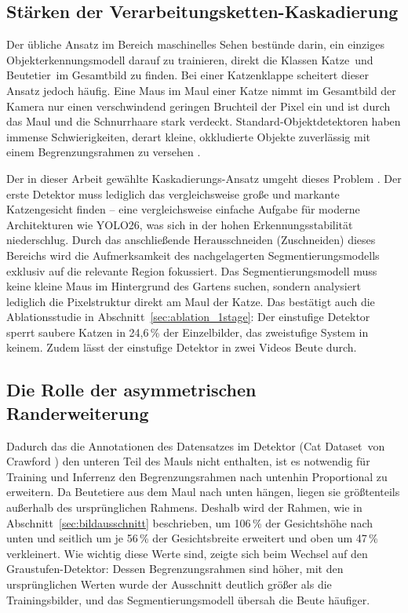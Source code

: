 \subsection{Stärken der Verarbeitungsketten-Kaskadierung}
Der übliche Ansatz im Bereich maschinelles Sehen bestünde darin, ein einziges Objekterkennungsmodell darauf zu trainieren, direkt die Klassen \glqq Katze\grqq\ und \glqq Beutetier\grqq\ im Gesamtbild zu finden. Bei einer Katzenklappe scheitert dieser Ansatz jedoch häufig. Eine Maus im Maul einer Katze nimmt im Gesamtbild der Kamera nur einen verschwindend geringen Bruchteil der Pixel ein und ist durch das Maul und die Schnurrhaare stark verdeckt. Standard-Objektdetektoren haben immense Schwierigkeiten, derart kleine, okkludierte Objekte zuverlässig mit einem Begrenzungsrahmen zu versehen \cite{tong2020small}.

Der in dieser Arbeit gewählte Kaskadierungs-Ansatz umgeht dieses Problem \cite{baumann2020smartcatflap, zhang2014partbased}. Der erste Detektor muss lediglich das vergleichsweise große und markante Katzengesicht finden – eine vergleichsweise einfache Aufgabe für moderne Architekturen wie YOLO26, was sich in der hohen Erkennungsstabilität niederschlug. Durch das anschließende Herausschneiden (Zuschneiden) dieses Bereichs wird die Aufmerksamkeit des nachgelagerten Segmentierungsmodells exklusiv auf die relevante Region fokussiert. Das Segmentierungsmodell muss keine kleine Maus im Hintergrund des Gartens suchen, sondern analysiert lediglich die Pixelstruktur direkt am Maul der Katze. Das bestätigt auch die Ablationsstudie in Abschnitt~\ref{sec:ablation_1stage}: Der einstufige Detektor sperrt saubere Katzen in 24,6\,\% der Einzelbilder, das zweistufige System in keinem. Zudem lässt der einstufige Detektor in zwei Videos Beute durch.

\subsection{Die Rolle der asymmetrischen Randerweiterung}
Dadurch das die Annotationen des Datensatzes im Detektor (\glqq Cat Dataset\grqq\ von Crawford \cite{kaggle2024cat}) den unteren Teil des Mauls nicht enthalten, ist es notwendig für Training und Inferrenz den Begrenzungsrahmen nach untenhin Proportional zu erweitern. Da Beutetiere aus dem Maul nach unten hängen, liegen sie größtenteils außerhalb des ursprünglichen Rahmens. Deshalb wird der Rahmen, wie in Abschnitt~\ref{sec:bildausschnitt} beschrieben, um 106\,\% der Gesichtshöhe nach unten und seitlich um je 56\,\% der Gesichtsbreite erweitert und oben um 47\,\% verkleinert. Wie wichtig diese Werte sind, zeigte sich beim Wechsel auf den Graustufen-Detektor: Dessen Begrenzungsrahmen sind höher, mit den ursprünglichen Werten wurde der Ausschnitt deutlich größer als die Trainingsbilder, und das Segmentierungsmodell übersah die Beute häufiger.

